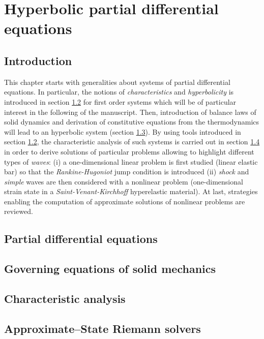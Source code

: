 \chapter{Hyperbolic partial differential equations}
\newpage
\section{Introduction}
This chapter starts with generalities about systems of partial differential equations. In particular, the notions of \textit{characteristics} and \textit{hyperbolicity} is introduced in section \ref{sec:PDEs} for first order systems which will be of particular interest in the following of the manuscript.
Then, introduction of balance laws of solid dynamics and derivation of constitutive equations from the thermodynamics will lead to an hyperbolic system (section \ref{sec:solidMech_equations}). By using tools introduced in section \ref{sec:PDEs}, the characteristic analysis of such systems is carried out in section \ref{sec:characteristic_analysis} in order to derive solutions of particular problems allowing to highlight different types of \textit{waves}: (i) a one-dimensional linear problem is first studied (linear elastic bar) so that the \textit{Rankine-Hugoniot} jump condition is introduced (ii) \textit{shock} and \textit{simple} waves are then considered with a nonlinear problem (one-dimensional strain state in a \textit{Saint-Venant-Kirchhoff} hyperelastic material). At last, strategies enabling the computation of approximate solutions of nonlinear problems are reviewed.



\section{Partial differential equations}
\label{sec:PDEs}


\section{Governing equations of solid mechanics}
\label{sec:solidMech_equations}



\section{Characteristic analysis}
\label{sec:characteristic_analysis}



\section{Approximate--State Riemann solvers}
\label{sec:riemann_solvers}






